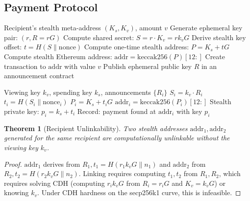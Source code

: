 \documentclass[11pt,a4paper]{article}
\newtheorem{theorem}{Theorem}[section]
\begin{document}
\subsection{Payment Protocol}

\begin{algorithm}[H]
\caption{Stealth Address Payment (Sender)}
\label{alg:stealth-send}
\begin{algorithmic}[1]
\Require Recipient's stealth meta-address $(K_s, K_v)$, amount $v$
\State Generate ephemeral key pair: $(r, R = rG)$
\State Compute shared secret: $S = r \cdot K_v = r k_v G$
\State Derive stealth key offset: $t = H(S \| \text{nonce})$
\State Compute one-time stealth address:
    \Statex \quad $P = K_s + tG$ 
\State Compute stealth Ethereum address:
    \Statex \quad $\mathrm{addr} = \mathrm{keccak256}(P)[12:]$
\State Create transaction to $\mathrm{addr}$ with value $v$
\State Publish ephemeral public key $R$ in an announcement contract
\end{algorithmic}
\end{algorithm}

\begin{algorithm}[H]
\caption{Stealth Address Scanning (Recipient)}
\label{alg:stealth-scan}
\begin{algorithmic}[1]
\Require Viewing key $k_v$, spending key $k_s$, announcements $\{R_i\}$
    \State $S_i = k_v \cdot R_i$ 
    \State $t_i = H(S_i \| \text{nonce}_i)$
    \State $P_i = K_s + t_i G$
    \State $\mathrm{addr}_i = \mathrm{keccak256}(P_i)[12:]$
        \State Stealth private key: $p_i = k_s + t_i$
        \State Record: payment found at $\mathrm{addr}_i$ with key $p_i$
    \EndIf
\EndFor
\end{algorithmic}
\end{algorithm}

\begin{theorem}[Recipient Unlinkability]
    Two stealth addresses $\mathrm{addr}_1, \mathrm{addr}_2$ generated
    for the same recipient are computationally unlinkable without the
    viewing key $k_v$.
\end{theorem}

\begin{proof}
    $\mathrm{addr}_1$ derives from $R_1, t_1 = H(r_1 k_v G \| n_1)$
    and $\mathrm{addr}_2$ from $R_2, t_2 = H(r_2 k_v G \| n_2)$.
    Linking requires computing $t_1, t_2$ from $R_1, R_2$, which
    requires solving CDH (computing $r_i k_v G$ from $R_i = r_i G$ and
    $K_v = k_v G$) or knowing $k_v$.  Under CDH hardness on the
    secp256k1 curve, this is infeasible.
\end{proof}
\end{document}
